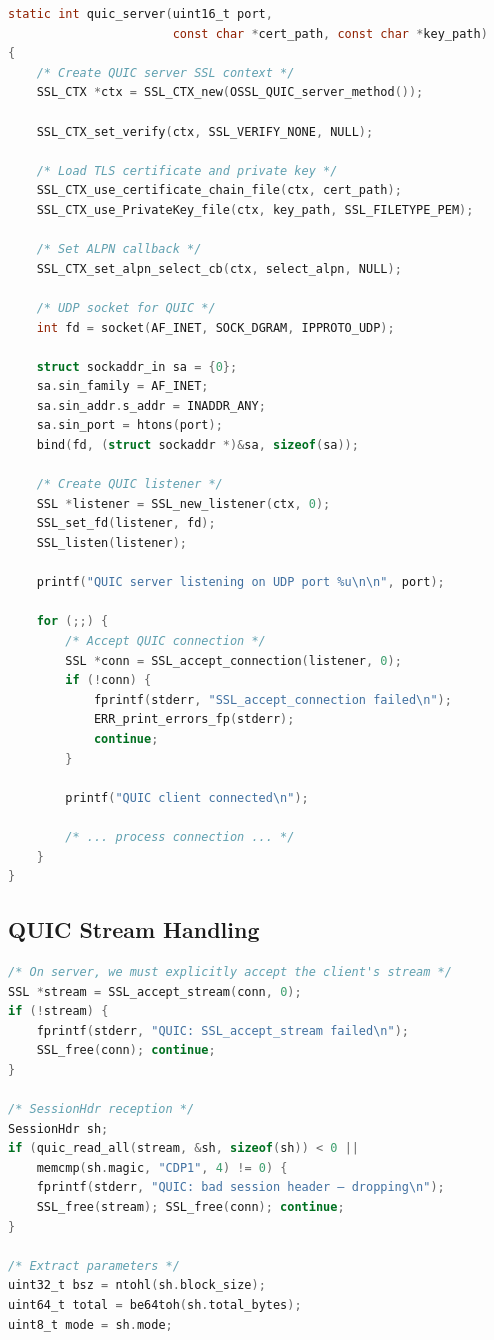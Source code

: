 \documentclass[12pt,a4paper]{article}
\begin{document}
\begin{lstlisting}[caption=QUIC Server: Initialization and Listener,label=lst:quic_server_init,language=C]
static int quic_server(uint16_t port,
                       const char *cert_path, const char *key_path)
{
    /* Create QUIC server SSL context */
    SSL_CTX *ctx = SSL_CTX_new(OSSL_QUIC_server_method());
    
    SSL_CTX_set_verify(ctx, SSL_VERIFY_NONE, NULL);
    
    /* Load TLS certificate and private key */
    SSL_CTX_use_certificate_chain_file(ctx, cert_path);
    SSL_CTX_use_PrivateKey_file(ctx, key_path, SSL_FILETYPE_PEM);
    
    /* Set ALPN callback */
    SSL_CTX_set_alpn_select_cb(ctx, select_alpn, NULL);
    
    /* UDP socket for QUIC */
    int fd = socket(AF_INET, SOCK_DGRAM, IPPROTO_UDP);
    
    struct sockaddr_in sa = {0};
    sa.sin_family = AF_INET;
    sa.sin_addr.s_addr = INADDR_ANY;
    sa.sin_port = htons(port);
    bind(fd, (struct sockaddr *)&sa, sizeof(sa));
    
    /* Create QUIC listener */
    SSL *listener = SSL_new_listener(ctx, 0);
    SSL_set_fd(listener, fd);
    SSL_listen(listener);
    
    printf("QUIC server listening on UDP port %u\n\n", port);
    
    for (;;) {
        /* Accept QUIC connection */
        SSL *conn = SSL_accept_connection(listener, 0);
        if (!conn) {
            fprintf(stderr, "SSL_accept_connection failed\n");
            ERR_print_errors_fp(stderr);
            continue;
        }
        
        printf("QUIC client connected\n");
        
        /* ... process connection ... */
    }
}
\end{lstlisting}

\subsection{QUIC Stream Handling}

\begin{lstlisting}[caption=QUIC Server: Stream Creation,label=lst:quic_stream,language=C]
/* On server, we must explicitly accept the client's stream */
SSL *stream = SSL_accept_stream(conn, 0);
if (!stream) {
    fprintf(stderr, "QUIC: SSL_accept_stream failed\n");
    SSL_free(conn); continue;
}

/* SessionHdr reception */
SessionHdr sh;
if (quic_read_all(stream, &sh, sizeof(sh)) < 0 ||
    memcmp(sh.magic, "CDP1", 4) != 0) {
    fprintf(stderr, "QUIC: bad session header – dropping\n");
    SSL_free(stream); SSL_free(conn); continue;
}

/* Extract parameters */
uint32_t bsz = ntohl(sh.block_size);
uint64_t total = be64toh(sh.total_bytes);
uint8_t mode = sh.mode;
\end{lstlisting}
\end{document}
